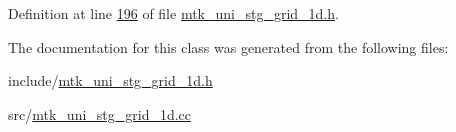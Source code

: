 Definition at line \hyperlink{mtk__uni__stg__grid__1d_8h_source_l00196}{196} of file \hyperlink{mtk__uni__stg__grid__1d_8h_source}{mtk\+\_\+uni\+\_\+stg\+\_\+grid\+\_\+1d.\+h}.



The documentation for this class was generated from the following files\+:\begin{DoxyCompactItemize}
\item 
include/\hyperlink{mtk__uni__stg__grid__1d_8h}{mtk\+\_\+uni\+\_\+stg\+\_\+grid\+\_\+1d.\+h}\item 
src/\hyperlink{mtk__uni__stg__grid__1d_8cc}{mtk\+\_\+uni\+\_\+stg\+\_\+grid\+\_\+1d.\+cc}\end{DoxyCompactItemize}
